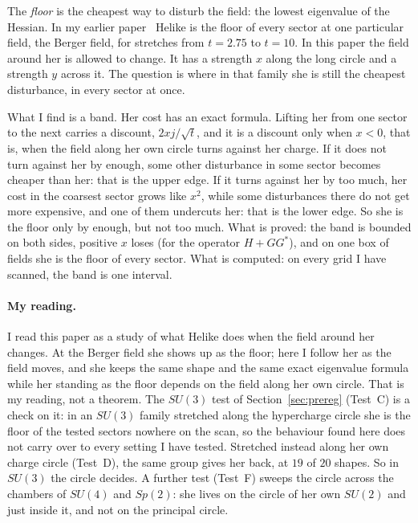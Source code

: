 \documentclass[11pt]{article}
\theoremstyle{definition}
\theoremstyle{remark}
\begin{document}
The \emph{floor} is the cheapest way to disturb the field: the lowest eigenvalue of the Hessian. In my earlier
paper~\cite{davisfloor2026} Helike is the floor of every sector at one particular field, the Berger field, for
stretches from $t=2.75$ to $t=10$. In this paper the field around her is allowed to change. It has a strength $x$
along the long circle and a strength $y$ across it. The question is where in that family she is still the cheapest
disturbance, in every sector at once.

What I find is a band. Her cost has an exact formula. Lifting her from one sector to the next carries a discount,
$2xj/\sqrt t$, and it is a discount only when $x<0$, that is, when the field along her own circle turns against her
charge. If it does not turn against her by enough, some other disturbance in some sector becomes cheaper than her:
that is the upper edge. If it turns against her by too much, her cost in the coarsest sector grows like $x^2$, while
some disturbances there do not get more expensive, and one of them undercuts her: that is the lower edge. So she is
the floor only by enough, but not too much. What is proved: the band is bounded on both sides, positive $x$ loses
(for the operator $H+GG^*$), and on one box of fields she is the floor of every sector. What is computed: on every grid
I have scanned, the band is one interval.

\paragraph{My reading.} I read this paper as a study of what Helike does when the field around her changes. At the
Berger field she shows up as the floor; here I follow her as the field moves, and she keeps the same shape and the same
exact eigenvalue formula while her standing as the floor depends on the field along her own circle. That is my reading,
not a theorem. The $SU(3)$ test of Section~\ref{sec:prereg} (Test~C) is a check on it: in an $SU(3)$ family stretched
along the hypercharge circle she is the floor of the tested sectors nowhere on the scan, so the behaviour found here
does not carry over to every setting I have tested. Stretched instead along her own charge circle (Test~D), the same
group gives her back, at $19$ of $20$ shapes. So in $SU(3)$ the circle decides. A further test (Test~F) sweeps the
circle across the chambers of $SU(4)$ and $Sp(2)$: she lives on the circle of her own $SU(2)$ and just inside it, and
not on the principal circle.

\end{document}
